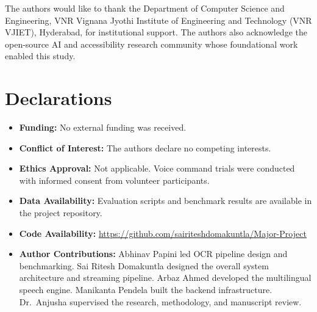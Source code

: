 \documentclass[pdflatex,sn-mathphys-num]{sn-jnl}
\theoremstyle{thmstyleone}%
\theoremstyle{thmstyletwo}%
\theoremstyle{thmstylethree}%
\begin{document}
\backmatter

The authors would like to thank the Department of Computer Science and
Engineering, VNR Vignana Jyothi Institute of Engineering and Technology (VNR VJIET),
Hyderabad, for institutional support. The authors also acknowledge the open-source AI and
accessibility research community whose foundational work enabled this study.

\section*{Declarations}
\begin{itemize}
  \item \textbf{Funding:} No external funding was received.
  \item \textbf{Conflict of Interest:} The authors declare no competing interests.
  \item \textbf{Ethics Approval:} Not applicable. Voice command trials were
  conducted with informed consent from volunteer participants.
  \item \textbf{Data Availability:} Evaluation scripts and benchmark results are
  available in the project repository.
  \item \textbf{Code Availability:}
  \url{https://github.com/sairiteshdomakuntla/Major-Project}
  \item \textbf{Author Contributions:} Abhinav Papini led OCR pipeline design
  and benchmarking. Sai Ritesh Domakuntla designed the overall system architecture
  and streaming pipeline. Arbaz Ahmed developed the multilingual speech engine.
  Manikanta Pendela built the backend infrastructure. Dr.\ Anjusha supervised the
  research, methodology, and manuscript review.
\end{itemize}
\end{document}
